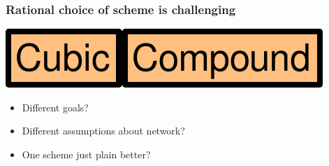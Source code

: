 \documentclass[svgnames]{beamer}
\newcommand{\ssline}{\vspace{8 pt}}
\begin{document}
\begin{frame}
\frametitle{Rational choice of scheme is challenging}

\begin{centering}
\includegraphics[height=20 pt]{cubic.pdf}\hspace{8 pt}{\bf vs.}\hspace{8 pt}\includegraphics[height=20 pt]{compound.pdf}

\end{centering}

\ssline
\ssline
\ssline

\begin{itemize}

\Large

\item Different goals?

\item Different assumptions about network?

\item One scheme just plain better?

\end{itemize}

\end{frame}

%
%
%
%
%
%
%
\end{document}
